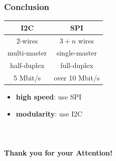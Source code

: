 \documentclass{beamer}
\renewcommand{\emph}[1]{\textbf{\textcolor{greeniot2}{#1}}}
\begin{document}
\begin{frame}
  \frametitle{Conclusion}
  
  \begin{center}
    \begin{tabular}{c|c}
      \textbf{I2C} & \textbf{SPI} \\ \hline
      $2$-wires & $3 + n$ wires \\
      multi-master & single-master \\
      half-duplex & full-duplex \\
      5 Mbit/s & over 10 Mbit/s
    \end{tabular}
  \end{center}
  
  \begin{itemize}
    \item \emph{high speed}: use SPI
    \item \emph{modularity}: use I2C
  \end{itemize}
\end{frame}

\section*{}
\begin{frame}
  \begin{center}
    \\
    \vspace{1cm}
    {\huge\bfseries Thank you for your Attention!}
  \end{center}
\end{frame}
\end{document}
